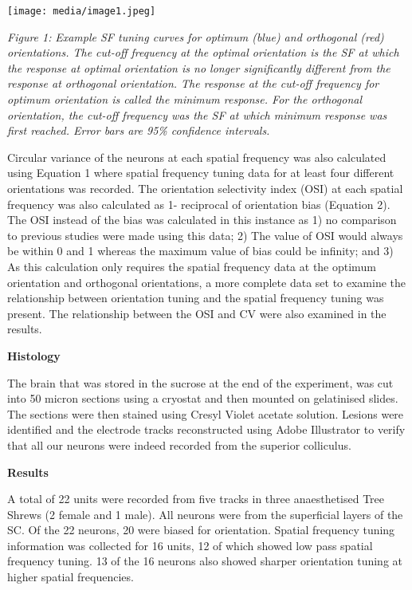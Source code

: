 \texttt{[image: media/image1.jpeg]}

\emph{Figure 1:} \emph{Example SF tuning curves for optimum (blue) and
orthogonal (red) orientations. The cut-off frequency at the optimal
orientation is the SF at which the response at optimal orientation is no
longer significantly different from the response at orthogonal
orientation. The response at the cut-off frequency for optimum
orientation is called the minimum response. For the orthogonal
orientation, the cut-off frequency was the SF at which minimum response
was first reached. Error bars are 95\% confidence intervals.}

Circular variance of the neurons at each spatial frequency was also
calculated using Equation 1 where spatial frequency tuning data for at
least four different orientations was recorded. The orientation
selectivity index (OSI) at each spatial frequency was also calculated as
1- reciprocal of orientation bias (Equation 2). The OSI instead of the
bias was calculated in this instance as 1) no comparison to previous
studies were made using this data; 2) The value of OSI would always be
within 0 and 1 whereas the maximum value of bias could be infinity; and
3) As this calculation only requires the spatial frequency data at the
optimum orientation and orthogonal orientations, a more complete data
set to examine the relationship between orientation tuning and the
spatial frequency tuning was present. The relationship between the OSI
and CV were also examined in the results.

\textbf{Histology}

The brain that was stored in the sucrose at the end of the experiment,
was cut into 50 micron sections using a cryostat and then mounted on
gelatinised slides. The sections were then stained using Cresyl Violet
acetate solution. Lesions were identified and the electrode tracks
reconstructed using Adobe Illustrator to verify that all our neurons
were indeed recorded from the superior colliculus.

\textbf{Results}

A total of 22 units were recorded from five tracks in three
anaesthetised Tree Shrews (2 female and 1 male). All neurons were from
the superficial layers of the SC. Of the 22 neurons, 20 were biased for
orientation. Spatial frequency tuning information was collected for 16
units, 12 of which showed low pass spatial frequency tuning. 13 of the
16 neurons also showed sharper orientation tuning at higher spatial
frequencies.

